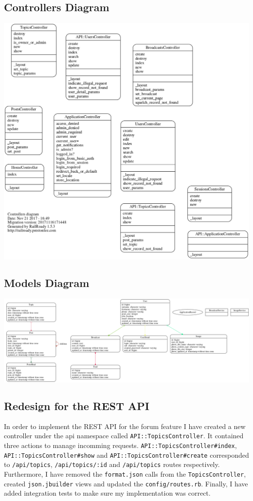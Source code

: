 \documentclass[a4paper, 11pt, titlepage]{article}
\begin{document}
\subsection{Controllers Diagram}
\includegraphics[scale=0.5]{controllers}
\begin{landscape}

  \subsection{Models Diagram}
  \includegraphics[scale=0.5]{models}
\end{landscape}

\subsection{Redesign for the REST API}
In order to implement the REST API for the forum feature I have created a new controller
under the api namespace called \texttt{API::TopicsController}. It contained three
actions to manage incomming requests. \texttt{API::TopicsController\#index}, \texttt{API::TopicsController\#show}
and \texttt{API::TopicsController\#create} corresponded to \texttt{/api/topics}, \texttt{/api/topics/:id} and
\texttt{/api/topics} routes respectively. Furthermore, I have removed the \texttt{format.json} calls from the
\texttt{TopicsController}, created \texttt{json.jbuilder} views and updated the \texttt{config/routes.rb}.
Finally, I have added integration tests to make sure my implementation was correct.
\end{document}

